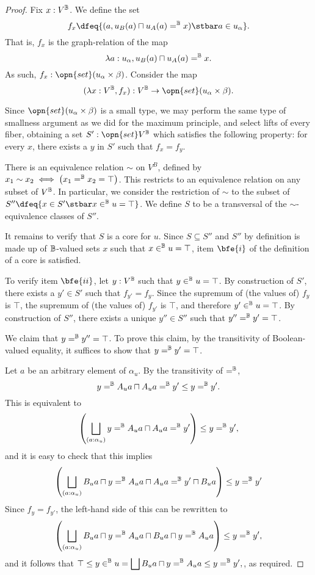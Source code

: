 \documentclass[11pt]{article}
\newcommand{\set}{\opn{set}}
\begin{document}
\begin{proof}
  Fix $x : V^{\mathbb{B}}$. We define the set
  $$
  f_x \dfeq \{(a, u_B (a) \sqcap u_A (a)  =^\B x) \stbar a \in u_{\alpha}\}.
  $$
  That is, $f_x$ is the graph-relation of the map
  $$
\lambda a : u_{\alpha}, u_B (a) \sqcap u_A (a) =^{\mathbb{B}} x.
$$
As such, $f_x : \opn{set} (u_{\alpha} \times \beta)$. Consider the map
$$
(\lambda x : V^\B, f_x) : V^\B \to \opn{set}(u_{\alpha} \times \beta).
$$

Since $\opn{set}(u_{\alpha} \times \beta)$ is a small type, we may perform the same type of smallness argument as we did for the maximum principle, and select lifts of every fiber, obtaining a set $S' : \set V^\B$ which satisfies the following property: for every $x$, there exists a $y$ in $S'$ such that $f_x = f_y$.

There is an equivalence relation $\sim$ on $V^B$, defined by $x_1 \sim x_2 \iff \left(x_1 =^{\mathbb{B}} x_2 = \top\right)$. This restricts to an equivalence relation on any subset of $V^{\mathbb{B}}$. In particular, we consider the restriction of $\sim$ to the subset of $S'' \dfeq \{x \in S' \stbar x \in^\B u = \top\}$. We define $S$ to be a transversal of the $\sim$-equivalence classes of $S''$.

It remains to verify that $S$ is a core for $u$. Since $S \subseteq S''$ and $S''$ by definition is made up of $\mathbb{B}$-valued sets $x$ such that $x \in^{\mathbb{B}} u = \top$, item $\bfe{i}$ of the definition of a core is satisfied.

To verify item $\bfe{ii}$, let $y : V^{\mathbb{B}}$ such that $y \in^{\mathbb{B}} u = \top$. By construction of $S'$, there exists a $y' \in S'$ such that $f_{y'} = f_y$. Since the supremum of (the values of) $f_y$ is $\top$, the supremum of (the values of) $f_{y'}$ is $\top$, and therefore $y' \in^{\mathbb{B}} u = \top$. By construction of $S''$, there exists a unique $y'' \in S''$ such that $y'' =^{\mathbb{B}} y' = \top$.

We claim that $y =^{\mathbb{B}} y'' = \top$. To prove this claim, by the transitivity of Boolean-valued equality, it suffices to show that $y =^{\mathbb{B}} y' = \top$. %

Let $a$ be an arbitrary element of $\alpha_u$. By the transitivity of $=^{\mathbb{B}}$,
$$
y =^{\mathbb{B}} A_u a \sqcap A_u a =^{\mathbb{B}} y' \leq y =^{\mathbb{B}} y'.
$$
This is equivalent to
$$
\left(\bigsqcup_{(a : \alpha_u)} y =^{\mathbb{B}} A_u a \sqcap A_u a =^{\mathbb{B}} y'\right) \leq y =^{\mathbb{B}} y',
$$
and it is easy to check that this implies
$$
\left(\bigsqcup_{(a : \alpha_u)} B_u a \sqcap y =^{\mathbb{B}} A_u a \sqcap A_u a =^{\mathbb{B}} y' \sqcap B_u a \right) \leq y =^{\mathbb{B}} y'
$$
Since $f_y = f_{y'}$, the left-hand side of this can be rewritten to
$$
\left(\bigsqcup_{(a : \alpha_u)} B_u a \sqcap y =^{\mathbb{B}} A_u a \sqcap B_u a \sqcap y =^{\mathbb{B}} A_u a \right) \leq y =^{\mathbb{B}} y',
$$
and it follows that
$
\displaystyle{\top \leq y \in^{\mathbb{B}}u = \bigsqcup B_u a \sqcap y =^{\mathbb{B}}A_u a \leq y =^{\mathbb{B}}y'},
$, as required.


\end{proof}
\end{document}
